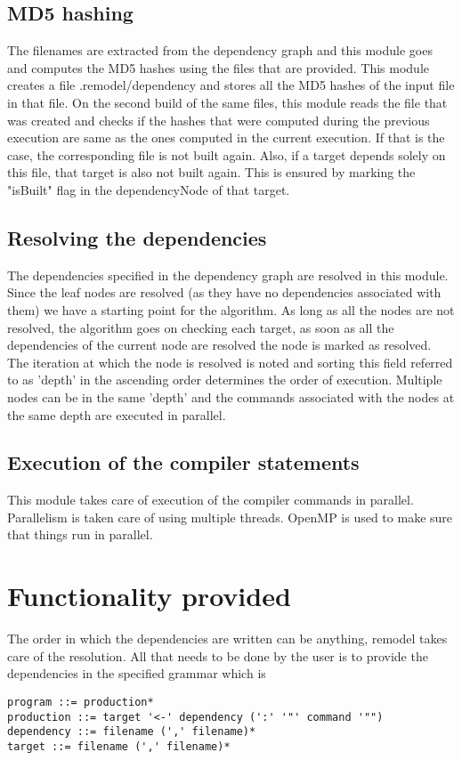 \documentclass[a4paper, 12pt, notitlepage]{report}
\begin{document}
\subsection{MD5 hashing}
The filenames are extracted from the dependency graph and this module goes and computes the MD5 hashes using the files that are provided. This module creates a file .remodel/dependency and stores all the MD5 hashes of the input file in that file. On the second build of the same files, this module reads the file that was created and checks if the hashes that were computed during the previous execution are same as the ones computed in the current execution. If that is the case, the corresponding file is not built again. Also, if a target depends solely on this file, that target is also not built again. This is ensured by marking the "isBuilt" flag in the dependencyNode of that target.

\subsection{Resolving the dependencies}
The dependencies specified in the dependency graph are resolved in this module. Since the leaf nodes are resolved (as they have no dependencies associated with them) we have a starting point for the algorithm. As long as all the nodes are not resolved, the algorithm goes on checking each target, as soon as all the dependencies of the current node are resolved the node is marked as resolved. The iteration at which the node is resolved is noted and sorting this field referred to as 'depth' in the ascending order determines the order of execution. Multiple nodes can be in the same 'depth' and the commands associated with the nodes at the same depth are executed in parallel.

\subsection{Execution of the compiler statements}
This module takes care of execution of the compiler commands in parallel. Parallelism is taken care of using multiple threads. OpenMP is used to make sure that things run in parallel.

\section{Functionality provided}
The order in which the dependencies are written can be anything, remodel takes care of the resolution. All that needs to be done by the user is to provide the dependencies in the specified grammar which is
\begin{verbatim}
program ::= production*
production ::= target '<-' dependency (':' '"' command '"")
dependency ::= filename (',' filename)*
target ::= filename (',' filename)*
\end{verbatim}
\end{document}
